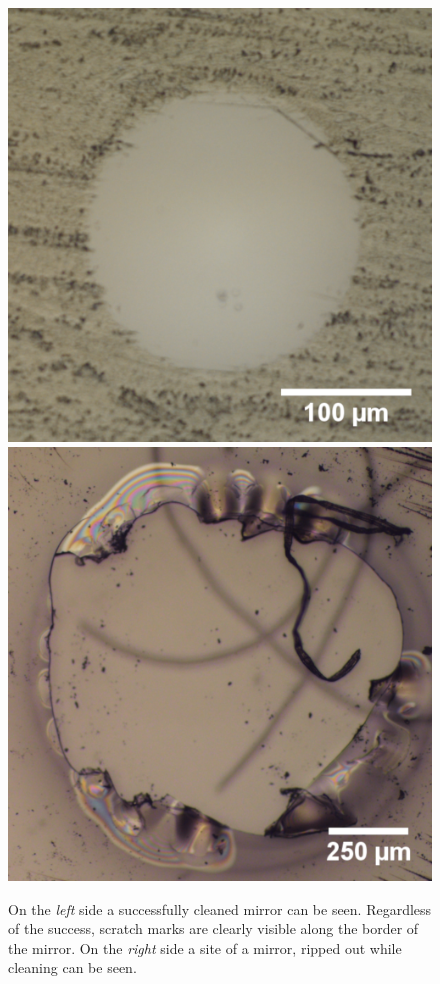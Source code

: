 \begin{figure}[H]
	\includegraphics[scale=1]{source/cleaning_good_scale_compressed}
	\includegraphics[scale=1]{source/cleaning_bad_scale_compressed}
	\caption{On the \textit{left} side a successfully cleaned mirror can be seen. Regardless of the success, scratch marks are clearly visible along the border of the mirror. On the \textit{right} side a site of a mirror, ripped out while cleaning can be seen.}
\end{figure}